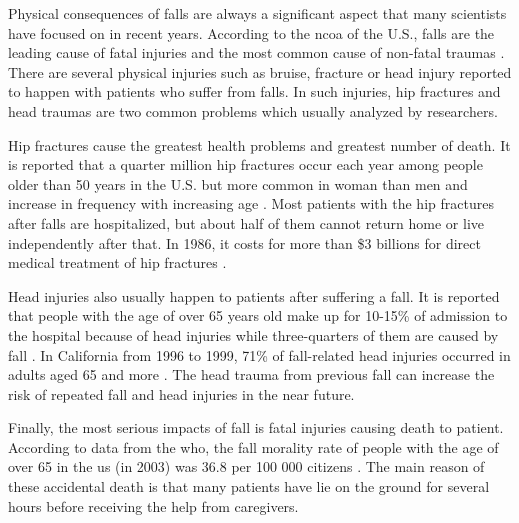 \documentclass[letterpaper,12pt,titlepage,oneside,final]{book}
\begin{document}
Physical consequences of falls are always a significant aspect that many scientists have focused on in recent years. According to the \gls{ncoa} of the U.S., falls are the leading cause of fatal injuries and the most common cause of non-fatal traumas \cite{ncoa}. There are several physical injuries such as bruise, fracture or head injury reported to happen with patients who suffer from falls. In such injuries, hip fractures and head traumas are two common problems which usually analyzed by researchers. \par
Hip fractures cause the greatest health problems and greatest number of death. It is reported that a quarter million hip fractures occur each year among people older than 50 years in the U.S. but more common in woman than men and increase in frequency with increasing age \cite{bibli_book} \cite{medicinenet_fracture}. Most patients with the hip fractures after falls are hospitalized, but about half of them cannot return home or live independently after that. In 1986, it costs for more than \$3 billions for direct medical treatment of hip fractures \cite{medicinenet_fracture}.\par 

Head injuries also usually happen to patients after suffering a fall. It is reported that people with the age of over 65 years old make up for 10-15\% of admission to the hospital because of head injuries while three-quarters of them are caused by fall \cite{bibli_book}. In California from 1996 to 1999, 71\% of fall-related head injuries occurred in adults aged 65 and more \cite{head_injury_1}. The head trauma from previous fall can increase the risk of repeated fall and head injuries in the near future.  \par

Finally, the most serious impacts of fall is fatal injuries causing death to patient. According to data from the \gls{who}, the fall morality rate of people with the age of over 65 in the \gls{us} (in 2003) was 36.8 per 100 000 citizens \cite{death_in_USA}. The main reason of these accidental death is that many patients have lie on the ground for several hours before receiving the help from caregivers. \par
\end{document}
